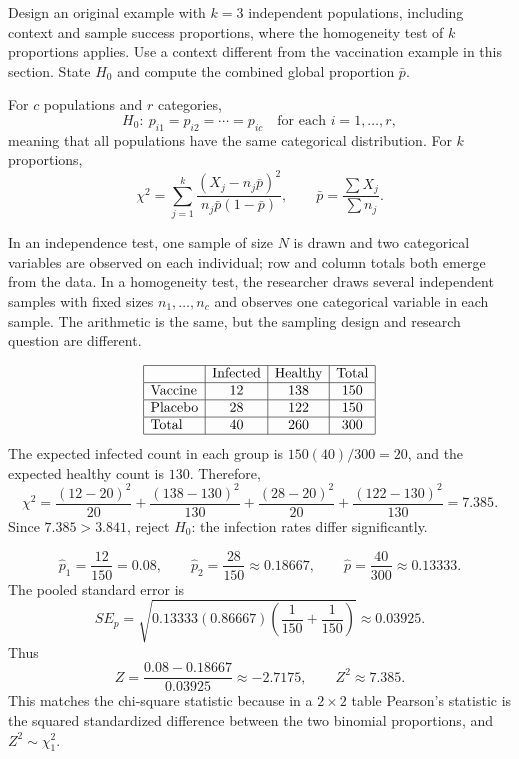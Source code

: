 \begin{problema}\label{prob:4eeb5bb}
Design an original example with $k=3$ independent populations, including context and sample success proportions, where the homogeneity test of $k$ proportions applies. Use a context different from the vaccination example in this section. State $H_0$ and compute the combined global proportion $\bar p$.
\end{problema}

\begin{solproblema}
For $c$ populations and $r$ categories,
\[
	H_0:\ p_{i1}=p_{i2}=\cdots=p_{ic}\quad\text{for each }i=1,\ldots,r,
\]
meaning that all populations have the same categorical distribution. For $k$ proportions,
\[
	\chi^2=\sum_{j=1}^k
	\frac{(X_j-n_j\bar p)^2}{n_j\bar p(1-\bar p)},
	\qquad
	\bar p=\frac{\sum X_j}{\sum n_j}.
\]
\end{solproblema}

\begin{solproblema}[prob:44ef899]
In an independence test, one sample of size $N$ is drawn and two categorical variables are observed on each individual; row and column totals both emerge from the data. In a homogeneity test, the researcher draws several independent samples with fixed sizes $n_1,\ldots,n_c$ and observes one categorical variable in each sample. The arithmetic is the same, but the sampling design and research question are different.
\end{solproblema}

\begin{solproblema}[prob:3a99a23]
\[
\begin{array}{|l|c|c|c|}\hline
 & \text{Infected} & \text{Healthy} & \text{Total}\\\hline
\text{Vaccine} & 12 & 138 & 150\\\hline
\text{Placebo} & 28 & 122 & 150\\\hline
\text{Total} & 40 & 260 & 300\\\hline
\end{array}
\]
The expected infected count in each group is $150(40)/300=20$, and the expected healthy count is $130$. Therefore,
\[
	\chi^2=\frac{(12-20)^2}{20}+\frac{(138-130)^2}{130}
	+\frac{(28-20)^2}{20}+\frac{(122-130)^2}{130}
	=7.385.
\]
Since $7.385>3.841$, reject $H_0$: the infection rates differ significantly.
\end{solproblema}

\begin{solproblema}[prob:a98f897]
\[
	\hat p_1=\frac{12}{150}=0.08,\qquad
	\hat p_2=\frac{28}{150}\approx0.18667,\qquad
	\hat p=\frac{40}{300}\approx0.13333.
\]
The pooled standard error is
\[
	SE_p=\sqrt{0.13333(0.86667)\left(\frac1{150}+\frac1{150}\right)}
	\approx0.03925.
\]
Thus
\[
	Z=\frac{0.08-0.18667}{0.03925}\approx-2.7175,
	\qquad Z^2\approx7.385.
\]
This matches the chi-square statistic because in a $2\times2$ table Pearson's statistic is the squared standardized difference between the two binomial proportions, and $Z^2\sim\chi^2_1$.
\end{solproblema}

